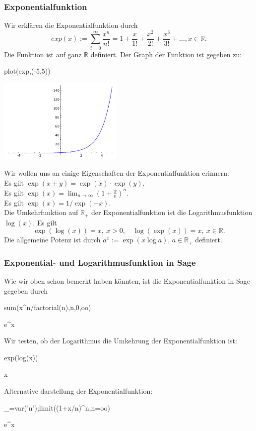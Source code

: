 \documentclass[fontsize=12pt,paper=a4,twoside,bibtotoc,idxtotoc,
liststotoc,pagesize,BCOR1.2cm,DIV15,chapterprefix,pagesize=pdftex]{scrbook}
\theoremstyle{plain}
\theoremstyle{definition}
\theoremstyle{remark}
\begin{document}
\subsubsection{Exponentialfunktion}
Wir erklären die Exponentialfunktion durch
\[  exp(x) := \sum_{i=0}^\infty \frac{x^n}{n!}= 1 + \frac{x}{1!} +
\frac{x^2}{2!}+ \frac{x^3}{3!}+ \dots, x \in \mathbb{R}. \]
Die Funktion ist auf ganz $\mathbb{R}$ definiert. Der Graph der Funktion ist gegeben zu:
\begin{sagein}
plot(exp,(-5,5))
\end{sagein}
\begin{center}
\includegraphics[width=6cm]{fexp.pdf}
\end{center}
Wir wollen uns an einige Eigenschaften der Exponentialfunktion erinnern:\\
Es gilt $\exp(x+y)=\exp(x) \cdot \exp(y)$.\\
Es gilt $\exp(x)=\lim_{n \rightarrow \infty} (1+\frac{x}{n})^n$.\\
Es gilt $\exp(x)=1/\exp(-x)$.\\
Die Umkehrfunktion auf $\mathbb{R}_+$ der Exponentialfunktion ist die
 Logarithmusfunktion $\log (x)$. Es gilt
\[ \exp(\log(x))=x, \ x >0, \quad \log ( \exp ( x ))=x, \ x \in \mathbb{R}.\] 
 Die allgemeine Potenz ist durch $a^x:=\exp( x \log a)$,
$a\in \mathbb{R}_+$
definiert. 

\subsubsection{Exponential- und Logarithmusfunktion in Sage}
Wie wir oben schon bemerkt haben könnten, ist die Exponentialfunktion in Sage gegeben durch
\begin{sagein}
sum(x^n/factorial(n),n,0,oo)
\end{sagein}
\begin{sage}
  e^x
\end{sage}
Wir testen, ob der Logarithmus die Umkehrung der Exponentialfunktion ist:
\begin{sagein}
exp(log(x))
\end{sagein}
\begin{sage}
  x
\end{sage}
Alternative darstellung der Exponentialfunktion:
\begin{sagein}
_=var('n');limit((1+x/n)^n,n=oo)
\end{sagein}
\begin{sage}
  e^x
\end{sage}
%   
\end{document}
